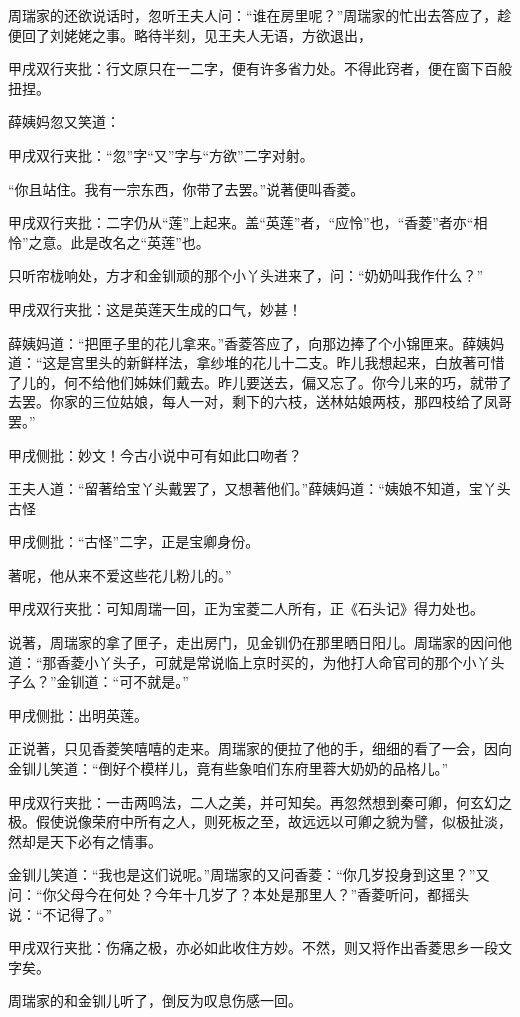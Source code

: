 \begin{parag}


    周瑞家的还欲说话时，忽听王夫人问：“谁在房里呢？”周瑞家的忙出去答应了，趁便回了刘姥姥之事。略待半刻，见王夫人无语，方欲退出，\begin{note}甲戌双行夹批：行文原只在一二字，便有许多省力处。不得此窍者，便在窗下百般扭捏。\end{note}薛姨妈忽又笑道：\begin{note}甲戌双行夹批：“忽”字“又”字与“方欲”二字对射。\end{note}“你且站住。我有一宗东西，你带了去罢。”说著便叫香菱。\begin{note}甲戌双行夹批：二字仍从“莲”上起来。盖“英莲”者，“应怜”也，“香菱”者亦“相怜”之意。此是改名之“英莲”也。\end{note}只听帘栊响处，方才和金钏顽的那个小丫头进来了，问：“奶奶叫我作什么？”\begin{note}甲戌双行夹批：这是英莲天生成的口气，妙甚！\end{note}薛姨妈道：“把匣子里的花儿拿来。”香菱答应了，向那边捧了个小锦匣来。薛姨妈道：“这是宫里头的新鲜样法，拿纱堆的花儿十二支。昨儿我想起来，白放著可惜了儿的，何不给他们姊妹们戴去。昨儿要送去，偏又忘了。你今儿来的巧，就带了去罢。你家的三位姑娘，每人一对，剩下的六枝，送林姑娘两枝，那四枝给了凤哥罢。”\begin{note}甲戌侧批：妙文！今古小说中可有如此口吻者？\end{note}王夫人道：“留著给宝丫头戴罢了，又想著他们。”薛姨妈道：“姨娘不知道，宝丫头古怪\begin{note}甲戌侧批：“古怪”二字，正是宝卿身份。\end{note}著呢，他从来不爱这些花儿粉儿的。”\begin{note}甲戌双行夹批：可知周瑞一回，正为宝菱二人所有，正《石头记》得力处也。\end{note}
\end{parag}


\begin{parag}


    说著，周瑞家的拿了匣子，走出房门，见金钏仍在那里晒日阳儿。周瑞家的因问他道：“那香菱小丫头子，可就是常说临上京时买的，为他打人命官司的那个小丫头子么？”金钏道：“可不就是。”\begin{note}甲戌侧批：出明英莲。\end{note}正说著，只见香菱笑嘻嘻的走来。周瑞家的便拉了他的手，细细的看了一会，因向金钏儿笑道：“倒好个模样儿，竟有些象咱们东府里蓉大奶奶的品格儿。”\begin{note}甲戌双行夹批：一击两鸣法，二人之美，并可知矣。再忽然想到秦可卿，何玄幻之极。假使说像荣府中所有之人，则死板之至，故远远以可卿之貌为譬，似极扯淡，然却是天下必有之情事。\end{note}金钏儿笑道：“我也是这们说呢。”周瑞家的又问香菱：“你几岁投身到这里？”又问：“你父母今在何处？今年十几岁了？本处是那里人？”香菱听问，都摇头说：“不记得了。”\begin{note}甲戌双行夹批：伤痛之极，亦必如此收住方妙。不然，则又将作出香菱思乡一段文字矣。\end{note}周瑞家的和金钏儿听了，倒反为叹息伤感一回。
\end{parag}


